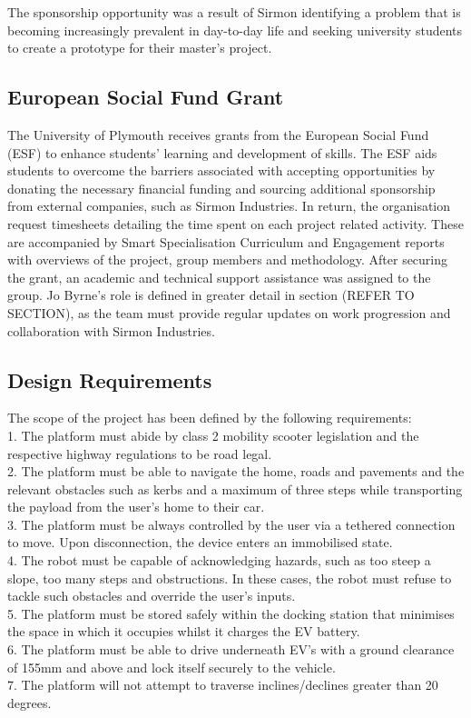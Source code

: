 \documentclass [12pt]{article}
\begin{document}
The sponsorship opportunity was a result of Sirmon identifying a problem that is becoming increasingly prevalent in day-to-day life and seeking university students to create a prototype for their master’s project.

\subsection{European Social Fund Grant}\label{sec:esf_grant}
The University of Plymouth receives grants from the European Social Fund (ESF) to enhance students’ learning and development of skills. The ESF aids students to overcome the barriers associated with accepting opportunities by donating the necessary financial funding and sourcing additional sponsorship from external companies, such as Sirmon Industries. In return, the organisation request timesheets detailing the time spent on each project related activity. These are accompanied by Smart Specialisation Curriculum and Engagement reports with overviews of the project, group members and methodology.
After securing the grant, an academic and technical support assistance was assigned to the group. Jo Byrne’s role is defined in greater detail in section (REFER TO SECTION), as the team must provide regular updates on work progression and collaboration with Sirmon Industries.


\subsection{Design Requirements}\label{sec:design_requirements}
The scope of the project has been defined by the following requirements: \\

1.	The platform must abide by class 2 mobility scooter legislation and the respective highway regulations to be road legal. \\
2.	The platform must be able to navigate the home, roads and pavements and the relevant obstacles such as kerbs and a maximum of three steps while transporting the payload from the user’s home to their car. \\
3.	The platform must be always controlled by the user via a tethered connection to move. Upon disconnection, the device enters an immobilised state. \\
4.	The robot must be capable of acknowledging hazards, such as too steep a slope, too many steps and obstructions. In these cases, the robot must refuse to tackle such obstacles and override the user’s inputs. \\
5.	The platform must be stored safely within the docking station that minimises the space in which it occupies whilst it charges the EV battery. \\
6.	The platform must be able to drive underneath EV’s with a ground clearance of 155mm and above and lock itself securely to the vehicle. \\
7.	The platform will not attempt to traverse inclines/declines greater than 20 degrees. \\
\end{document}
